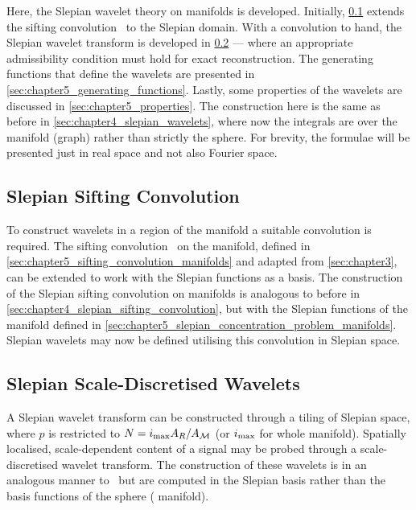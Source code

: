 Here, the Slepian wavelet theory on manifolds is developed.
Initially, \cref{sec:chapter5_slepian_sifting_convolution} extends the sifting convolution~\cite{Roddy2021} to the Slepian domain.
With a convolution to hand, the Slepian wavelet transform is developed in \cref{sec:chapter5_slepian_scale_discretised_wavelets} --- where an appropriate admissibility condition must hold for exact reconstruction.
The generating functions that define the wavelets are presented in \cref{sec:chapter5_generating_functions}.
Lastly, some properties of the wavelets are discussed in \cref{sec:chapter5_properties}.
The construction here is the same as before in \cref{sec:chapter4_slepian_wavelets}, where now the integrals are over the manifold (graph) rather than strictly the sphere.
For brevity, the formulae will be presented just in real space and not also Fourier space.

\subsection{Slepian Sifting Convolution}\label{sec:chapter5_slepian_sifting_convolution}

To construct wavelets in a region of the manifold a suitable convolution is required.
The sifting convolution~\cite{Roddy2021} on the manifold, defined in \cref{sec:chapter5_sifting_convolution_manifolds} and adapted from \cref{sec:chapter3}, can be extended to work with the Slepian functions as a basis.
The construction of the Slepian sifting convolution on manifolds is analogous to before in \cref{sec:chapter4_slepian_sifting_convolution}, but with the Slepian functions of the manifold defined in \cref{sec:chapter5_slepian_concentration_problem_manifolds}.
Slepian wavelets may now be defined utilising this convolution in Slepian space.

\subsection{Slepian Scale-Discretised Wavelets}\label{sec:chapter5_slepian_scale_discretised_wavelets}

A Slepian wavelet transform can be constructed through a tiling of Slepian space, where \(p\) is restricted to \(N=i_{\text{max}} A_{R}/A_{\mathcal{M}}\) (or \(i_{\text{max}}{}\) for whole manifold).
Spatially localised, scale-dependent content of a signal may be probed through a scale-discretised wavelet transform.
The construction of these wavelets is in an analogous manner to~\cite{Wiaux2008,McEwen2018} but are computed in the Slepian basis rather than the basis functions of the sphere (\cf{} manifold).

